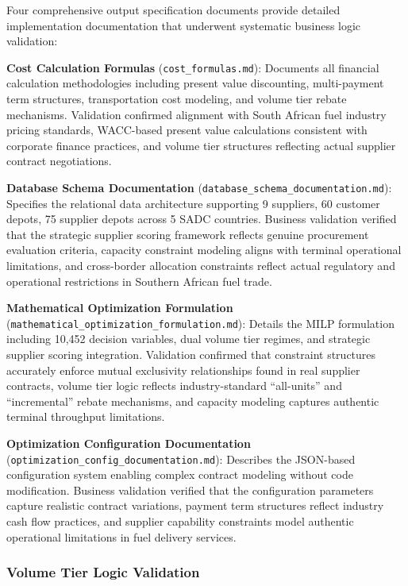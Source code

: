Four comprehensive output specification documents provide detailed implementation documentation that underwent systematic business logic validation:

\textbf{Cost Calculation Formulas} (\texttt{cost\_formulas.md}): Documents all financial calculation methodologies including present value discounting, multi-payment term structures, transportation cost modeling, and volume tier rebate mechanisms. Validation confirmed alignment with South African fuel industry pricing standards, WACC-based present value calculations consistent with corporate finance practices, and volume tier structures reflecting actual supplier contract negotiations.

\textbf{Database Schema Documentation} (\texttt{database\_schema\_documentation.md}): Specifies the relational data architecture supporting 9 suppliers, 60 customer depots, 75 supplier depots across 5 SADC countries. Business validation verified that the strategic supplier scoring framework reflects genuine procurement evaluation criteria, capacity constraint modeling aligns with terminal operational limitations, and cross-border allocation constraints reflect actual regulatory and operational restrictions in Southern African fuel trade.

\textbf{Mathematical Optimization Formulation} (\texttt{mathematical\_optimization\_formulation.md}): Details the MILP formulation including 10,452 decision variables, dual volume tier regimes, and strategic supplier scoring integration. Validation confirmed that constraint structures accurately enforce mutual exclusivity relationships found in real supplier contracts, volume tier logic reflects industry-standard ``all-units'' and ``incremental'' rebate mechanisms, and capacity modeling captures authentic terminal throughput limitations.

\textbf{Optimization Configuration Documentation} (\texttt{optimization\_config\_documentation.md}): Describes the JSON-based configuration system enabling complex contract modeling without code modification. Business validation verified that the configuration parameters capture realistic contract variations, payment term structures reflect industry cash flow practices, and supplier capability constraints model authentic operational limitations in fuel delivery services.

\subsubsection{Volume Tier Logic Validation}

